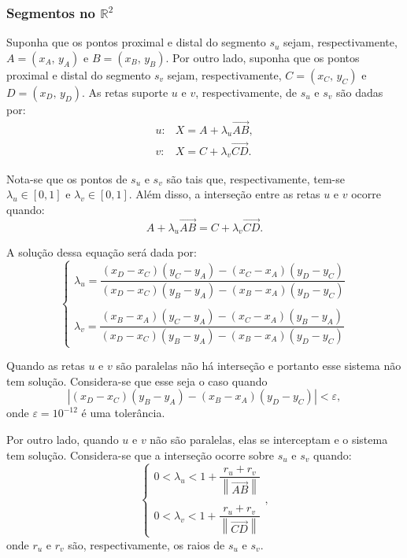 \subsubsection{Segmentos no $\mathbb{R}^2$}\label{subsec:intersecao-2d}

Suponha que os pontos proximal e distal do segmento $s_u$ sejam, respectivamente, 
$A = (x_A,\, y_A)$ e $B = (x_B,\, y_B)$. 
Por outro lado, suponha que os pontos proximal e distal do segmento $s_v$ sejam, respectivamente, 
$C = (x_C,\, y_C)$ e $D = (x_D,\, y_D)$. 
As retas suporte $u$ e $v$, respectivamente, de $s_u$ e $s_v$ são dadas por:
\begin{eqnarray}
  u: & X = A + \lambda_u\overrightarrow{AB}\label{eq:reta-suporte-do-segmento-su}, \\
  v: & X = C + \lambda_v\overrightarrow{CD}\label{eq:reta-supor	te-do-segmento-sv}.
\end{eqnarray}

Nota-se que os pontos de $s_u$ e $s_v$ são tais que, respectivamente, 
tem-se $\lambda_u\in[0, 1]$ e $\lambda_v\in[0, 1]$. Além disso, a interseção entre 
as retas $u$ e $v$ ocorre quando:
\begin{equation}
  A + \lambda_u\overrightarrow{AB} = C + \lambda_v\overrightarrow{CD}.
  \label{eq:intersecao-segmentos-caso-2d}
\end{equation}

A solução dessa equação será dada por:
\begin{equation}
  \begin{cases}
    \lambda_u = \dfrac{(x_D - x_C)(y_C - y_A) - (x_C - x_A)(y_D - y_C)}{(x_D - x_C)(y_B - y_A) - (x_B - x_A)(y_D - y_C)}\\ \\
    \lambda_v = \dfrac{(x_B - x_A)(y_C - y_A) - (x_C - x_A)(y_B - y_A)}{(x_D - x_C)(y_B - y_A) - (x_B - x_A)(y_D - y_C)}
  \end{cases}
  \label{eq:solucao-sistema-intersecao-segmentos-caso-2d}
\end{equation}

Quando as retas $u$ e $v$ são paralelas não há interseção e portanto esse sistema não tem solução.
Considera-se que esse seja o caso quando
\begin{equation}
  |(x_D - x_C)(y_B - y_A) - (x_B - x_A)(y_D - y_C)| < \varepsilon,
  \label{eq:solucao-tolerancia-sistema-intersecao-segmentos-caso-2d}
\end{equation}
onde $\varepsilon = 10^{-12}$ é uma tolerância.

Por outro lado, quando $u$ e $v$ não são paralelas, elas se interceptam e o sistema tem solução.
Considera-se que a interseção ocorre sobre $s_u$ e $s_v$ quando: 
\begin{equation}
  \begin{cases}
    0 < \lambda_u < 1 + \dfrac{r_u + r_v}{\left\|\overrightarrow{AB}\right\|} \\
    \\
    0 < \lambda_v < 1 + \dfrac{r_u + r_v}{\left\|\overrightarrow{CD}\right\|}
  \end{cases},
  \label{eq:solucao-tolerancia-intersecao-segmentos-caso-2d}
\end{equation}
onde $r_u$ e $r_v$ são, respectivamente, os raios de $s_u$ e $s_v$.

